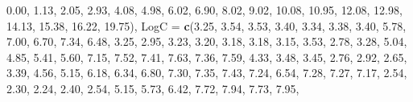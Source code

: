 \documentclass[]{book}
\newenvironment{Shaded}{\begin{snugshade}}{\end{snugshade}}
\newcommand{\KeywordTok}[1]{\textcolor[rgb]{0.13,0.29,0.53}{\textbf{#1}}}
\newcommand{\DataTypeTok}[1]{\textcolor[rgb]{0.13,0.29,0.53}{#1}}
\newcommand{\FloatTok}[1]{\textcolor[rgb]{0.00,0.00,0.81}{#1}}
\newcommand{\NormalTok}[1]{#1}
\theoremstyle{definition}
\theoremstyle{definition}
\theoremstyle{definition}
\theoremstyle{remark}
\begin{document}
\begin{Shaded}
\begin{Highlighting}[]
                            \FloatTok{0.00}\NormalTok{, }\FloatTok{1.13}\NormalTok{, }\FloatTok{2.05}\NormalTok{, }\FloatTok{2.93}\NormalTok{, }\FloatTok{4.08}\NormalTok{, }\FloatTok{4.98}\NormalTok{, }\FloatTok{6.02}\NormalTok{, }\FloatTok{6.90}\NormalTok{,}
                            \FloatTok{8.02}\NormalTok{, }\FloatTok{9.02}\NormalTok{, }\FloatTok{10.08}\NormalTok{, }\FloatTok{10.95}\NormalTok{, }\FloatTok{12.08}\NormalTok{, }\FloatTok{12.98}\NormalTok{, }\FloatTok{14.13}\NormalTok{,}
                            \FloatTok{15.38}\NormalTok{, }\FloatTok{16.22}\NormalTok{, }\FloatTok{19.75}\NormalTok{),}
                   \DataTypeTok{LogC =} \KeywordTok{c}\NormalTok{(}\FloatTok{3.25}\NormalTok{, }\FloatTok{3.54}\NormalTok{, }\FloatTok{3.53}\NormalTok{, }\FloatTok{3.40}\NormalTok{, }\FloatTok{3.34}\NormalTok{, }\FloatTok{3.38}\NormalTok{, }\FloatTok{3.40}\NormalTok{, }\FloatTok{5.78}\NormalTok{,}
                            \FloatTok{7.00}\NormalTok{, }\FloatTok{6.70}\NormalTok{, }\FloatTok{7.34}\NormalTok{, }\FloatTok{6.48}\NormalTok{, }\FloatTok{3.25}\NormalTok{, }\FloatTok{2.95}\NormalTok{, }\FloatTok{3.23}\NormalTok{, }\FloatTok{3.20}\NormalTok{,}
                            \FloatTok{3.18}\NormalTok{, }\FloatTok{3.18}\NormalTok{, }\FloatTok{3.15}\NormalTok{, }\FloatTok{3.53}\NormalTok{, }\FloatTok{2.78}\NormalTok{, }\FloatTok{3.28}\NormalTok{, }\FloatTok{5.04}\NormalTok{, }\FloatTok{4.85}\NormalTok{,}
                            \FloatTok{5.41}\NormalTok{, }\FloatTok{5.60}\NormalTok{, }\FloatTok{7.15}\NormalTok{, }\FloatTok{7.52}\NormalTok{, }\FloatTok{7.41}\NormalTok{, }\FloatTok{7.63}\NormalTok{, }\FloatTok{7.36}\NormalTok{, }\FloatTok{7.59}\NormalTok{,}
                            \FloatTok{4.33}\NormalTok{, }\FloatTok{3.48}\NormalTok{, }\FloatTok{3.45}\NormalTok{, }\FloatTok{2.76}\NormalTok{, }\FloatTok{2.92}\NormalTok{, }\FloatTok{2.65}\NormalTok{, }\FloatTok{3.39}\NormalTok{, }\FloatTok{4.56}\NormalTok{,}
                            \FloatTok{5.15}\NormalTok{, }\FloatTok{6.18}\NormalTok{, }\FloatTok{6.34}\NormalTok{, }\FloatTok{6.80}\NormalTok{, }\FloatTok{7.30}\NormalTok{, }\FloatTok{7.35}\NormalTok{, }\FloatTok{7.43}\NormalTok{, }\FloatTok{7.24}\NormalTok{,}
                            \FloatTok{6.54}\NormalTok{, }\FloatTok{7.28}\NormalTok{, }\FloatTok{7.27}\NormalTok{, }\FloatTok{7.17}\NormalTok{, }\FloatTok{2.54}\NormalTok{, }\FloatTok{2.30}\NormalTok{, }\FloatTok{2.24}\NormalTok{, }\FloatTok{2.40}\NormalTok{,}
                            \FloatTok{2.54}\NormalTok{, }\FloatTok{5.15}\NormalTok{, }\FloatTok{5.73}\NormalTok{, }\FloatTok{6.42}\NormalTok{, }\FloatTok{7.72}\NormalTok{, }\FloatTok{7.94}\NormalTok{, }\FloatTok{7.73}\NormalTok{, }\FloatTok{7.95}\NormalTok{,}

\end{Highlighting}
\end{Shaded}
\end{document}
